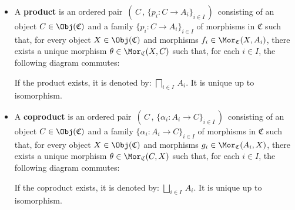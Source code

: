 \begin{theorem}
\begin{itemize}
\item
	A \textbf{product} is an ordered pair
	\,$\left(\,C\,,\,\{p_{i} : C \longrightarrow A_{i}\}_{i \in I}\,\right)$\,
	consisting of an object $C \in \Obj(\mathfrak{C})$ and a family 
	$\{p_{i} : C \longrightarrow A_{i}\}_{i \in I}$ of morphisms in $\mathfrak{C}$
	such that,
	for every object $X \in \Obj(\mathfrak{C})$ and morphisms $f_{i} \in \Mor_{\mathfrak{C}}(X,A_{i})$,
	there exists a unique morphism $\theta \in \Mor_{\mathfrak{C}}(X,C)$ such that,
	for each $i \in I$, the following diagram commutes:
	\begin{center}
	\end{center}
	If the product exists, it is denoted by: $\underset{i \in I}{\bigsqcap}\,A_{i}$.
	It is unique up to isomorphism.
\item
	A \textbf{coproduct} is an ordered pair
	\,$\left(\,C\,,\,\{\alpha_{i} : A_{i} \longrightarrow C\}_{i \in I}\,\right)$\,
	consisting of an object $C \in \Obj(\mathfrak{C})$ and a family 
	$\{\alpha_{i} : A_{i} \longrightarrow C\}_{i \in I}$ of morphisms in $\mathfrak{C}$
	such that,
	for every object $X \in \Obj(\mathfrak{C})$ and morphisms $g_{i} \in \Mor_{\mathfrak{C}}(A_{i},X)$,
	there exists a unique morphism $\theta \in \Mor_{\mathfrak{C}}(C,X)$ such that,
	for each $i \in I$, the following diagram commutes:
	\begin{center}
	\end{center}
	If the coproduct exists, it is denoted by: $\underset{i \in I}{\bigsqcup}\,A_{i}$.
	It is unique up to isomorphism.
\end{itemize}
\end{theorem}


